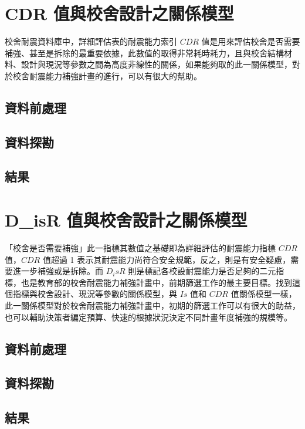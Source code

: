 \section{CDR 值與校舍設計之關係模型}

校舍耐震資料庫中，詳細評估表的耐震能力索引 $CDR$ 值是用來評估校舍是否需要補強、甚至是拆除的最重要依據，此數值的取得非常耗時耗力，且與校舍結構材料、設計與現況等參數之間為高度非線性的關係，如果能夠取的此一關係模型，對於校舍耐震能力補強計畫的進行，可以有很大的幫助。

\subsection{資料前處理}
\subsection{資料探勘}
\subsection{結果}


\section{D\_isR 值與校舍設計之關係模型}

「校舍是否需要補強」此一指標其數值之基礎即為詳細評估的耐震能力指標 $CDR$ 值，$CDR$ 值超過 1 表示其耐震能力尚符合安全規範，反之，則是有安全疑慮，需要進一步補強或是拆除。而 $D_isR$ 則是標記各校設耐震能力是否足夠的二元指標，也是教育部的校舍耐震能力補強計畫中，前期篩選工作的最主要目標。找到這個指標與校舍設計、現況等參數的關係模型，與 $Is$ 值和 $CDR$ 值關係模型一樣，此一關係模型對於校舍耐震能力補強計畫中，初期的篩選工作可以有很大的助益，也可以輔助決策者編定預算、快速的根據狀況決定不同計畫年度補強的規模等。

\subsection{資料前處理}
\subsection{資料探勘}
\subsection{結果}

